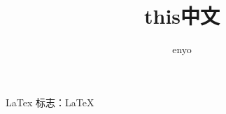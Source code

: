 \documentclass[UTF8]{ctexart}
\author{enyo}
\title{this中文}
\begin{document}
\maketitle
LaTex 标志：\LaTeX
\end{document}
